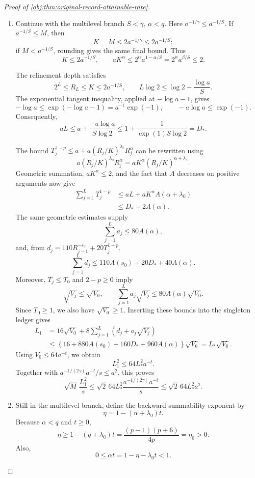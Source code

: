 \documentclass[11pt]{article}
\begin{document}
\begin{proof}[Proof of \cref{obj:thm:original-record-attainable-rate}]
\begin{enumerate}
\item Continue with the multilevel branch \(S<\gamma\), \(\alpha<q\).
Here \(a^{-1/\gamma}\le a^{-1/S}\). If \(a^{-1/S}\le M\), then
\[
K=M\le2a^{-1/\gamma}\le2a^{-1/S};
\]
if \(M<a^{-1/S}\), rounding gives the same final bound. Thus
\[
K\le2a^{-1/S},
\qquad
aK^\alpha
\le2^\alpha a^{1-\alpha/S}
=2^\alpha a^{\beta/S}\le2.
\]

The refinement depth satisfies
\[
2^L\le R_L\le K\le2a^{-1/S},
\qquad
L\log2\le\log2-\frac{\log a}{S}.
\]
The exponential tangent inequality, applied at \(-\log a-1\), gives
\[
-\log a
\le\exp(-\log a-1)=a^{-1}\exp(-1),
\qquad
-a\log a\le\exp(-1).
\]
Consequently,
\[
aL
\le a+\frac{-a\log a}{S\log2}
\le1+\frac{1}{\exp(1)S\log2}
=D_*.
\]

The bound \(T_j^{1-p}\le a+a(R_j/K)^{\lambda_0}R_j^\alpha\) can be rewritten using
\[
a(R_j/K)^{\lambda_0}R_j^\alpha
=aK^\alpha(R_j/K)^{\alpha+\lambda_0}.
\]
Geometric summation, \(aK^\alpha\le2\), and the fact that \(A\) decreases on positive arguments now give
\[
\begin{aligned}
\sum_{j=1}^{L}T_j^{1-p}
&\le aL+aK^\alpha A(\alpha+\lambda_0)\\
&\le D_*+2A(\alpha).
\end{aligned}
\]
The same geometric estimates supply
\[
\sum_{j=1}^{L}a_j\le80A(\alpha),
\]
and, from \(d_j=110R_{j-1}^{-s_0}+20T_j^{1-p}\),
\[
\sum_{j=1}^{L}d_j
\le110A(s_0)+20D_*+40A(\alpha).
\]
Moreover, \(T_j\le T_0\) and \(2-p\ge0\) imply
\[
\sqrt{V_j}\le\sqrt{V_0},
\qquad
\sum_{j=1}^{L}a_j\sqrt{V_j}
\le80A(\alpha)\sqrt{V_0}.
\]
Since \(T_0\ge1\), we also have \(\sqrt{V_0}\ge1\).
Inserting these bounds into the singleton ledger gives
\[
\begin{aligned}
L_1
&=16\sqrt{V_0}
 +8\sum_{j=1}^{L}(d_j+a_j\sqrt{V_j})\\
&\le
\left\{16+880A(s_0)+160D_*+960A(\alpha)\right\}
\sqrt{V_0}
=L_*\sqrt{V_0}.
\end{aligned}
\]
Using \(V_0\le64a^{-t}\), we obtain
\[
L_1^2\le64L_*^2a^{-t}.
\]
Together with \(a^{-1/(2\gamma)}a^{-t}/s\le a^2\), this proves
\[
\sqrt M\,\frac{L_1^2}{s}
\le\sqrt2\,64L_*^2
\frac{a^{-1/(2\gamma)}a^{-t}}{s}
\le\sqrt2\,64L_*^2a^2.
\]

\item Still in the multilevel branch, define the backward summability exponent by
\[
\eta=1-(\alpha+\lambda_0)t.
\]
Because \(\alpha<q\) and \(t\ge0\),
\[
\eta\ge1-(q+\lambda_0)t
=\frac{(p-1)(p+6)}{4p}
=\eta_0>0.
\]
Also,
\[
0\le\alpha t=1-\eta-\lambda_0t<1.
\]


\end{enumerate}
\end{proof}
\end{document}
